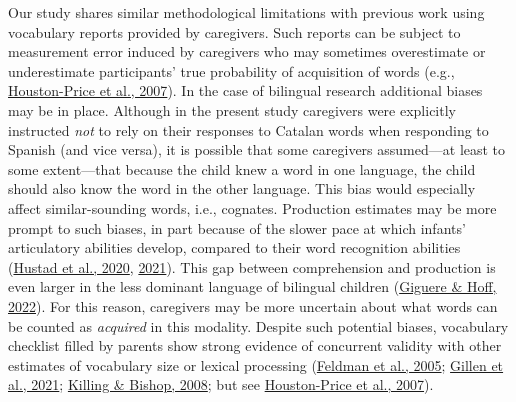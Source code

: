 \documentclass[
]{article}
\begin{document}
Our study shares similar methodological limitations with previous work
using vocabulary reports provided by caregivers. Such reports can be
subject to measurement error induced by caregivers who may sometimes
overestimate or underestimate participants' true probability of
acquisition of words (e.g.,
\protect\hyperlink{ref-houston-price2007discrepancy}{Houston-Price et
al., 2007}). In the case of bilingual research additional biases may be
in place. Although in the present study caregivers were explicitly
instructed \emph{not} to rely on their responses to Catalan words when
responding to Spanish (and vice versa), it is possible that some
caregivers assumed---at least to some extent---that because the child
knew a word in one language, the child should also know the word in the
other language. This bias would especially affect similar-sounding
words, i.e., cognates. Production estimates may be more prompt to such
biases, in part because of the slower pace at which infants'
articulatory abilities develop, compared to their word recognition
abilities (\protect\hyperlink{ref-hustad2020development}{Hustad et al.,
2020}, \protect\hyperlink{ref-hustad2021speech}{2021}). This gap between
comprehension and production is even larger in the less dominant
language of bilingual children
(\protect\hyperlink{ref-giguere2022bilingual}{Giguere \& Hoff, 2022}).
For this reason, caregivers may be more uncertain about what words can
be counted as \emph{acquired} in this modality. Despite such potential
biases, vocabulary checklist filled by parents show strong evidence of
concurrent validity with other estimates of vocabulary size or lexical
processing (\protect\hyperlink{ref-feldman2005concurrent}{Feldman et
al., 2005}; \protect\hyperlink{ref-gillen2021tapping}{Gillen et al.,
2021}; \protect\hyperlink{ref-killing2008move}{Killing \& Bishop, 2008};
but see
\protect\hyperlink{ref-houston-price2007discrepancy}{Houston-Price et
al., 2007}).
\end{document}
